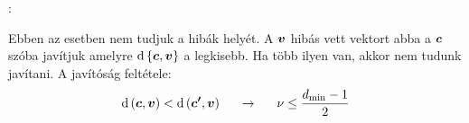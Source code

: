 \documentclass[main.tex]{subfiles}
\begin{document}
  \vspace*{1em}
  {\large {}:}
  \vspace{.5em}

  Ebben az esetben nem tudjuk a hibák helyét.
  A $\vb*{v}$ hibás vett vektort abba a $\vb*{c}$
  szóba javítjuk amelyre $\mathrm{d} \left\{
    \vb*{c}, \vb*{v}
  \right\}$ a legkisebb. Ha több ilyen van,
  akkor nem tudunk javítani. A javítóság feltétele:
  \begin{equation*}
    \mathrm{d} \left( \vb*{c}, \vb*{v} \right)
    < \mathrm{d} \left( \vb*{c'}, \vb*{v} \right)
    \hspace*{1.5em} \rightarrow \hspace*{1.5em}
    \nu \leq \frac{d_\mathrm{min} - 1}{2}
  \end{equation*}
\end{document}
